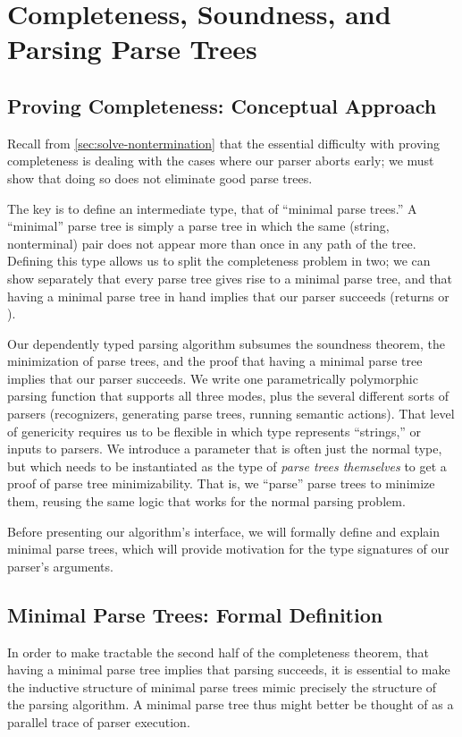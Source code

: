 \chapter{Completeness, Soundness, and Parsing Parse Trees}
\section{Proving Completeness: Conceptual Approach} \label{sec:conceptual-completeness} \label{sec:min:conceptual-intro}
  Recall from \autoref{sec:solve-nontermination} that the essential difficulty with proving completeness is dealing with the cases where our parser aborts early; we must show that doing so does not eliminate good parse trees.

  The key is to define an intermediate type, that of ``minimal parse trees.''  A ``minimal'' parse tree is simply a parse tree in which the same (string, nonterminal) pair does not appear more than once in any path of the tree.  Defining this type allows us to split the completeness problem in two; we can show separately that every parse tree gives rise to a minimal parse tree, and that having a minimal parse tree in hand implies that our parser succeeds (returns \true\space or \Some{\hole}).

  Our dependently typed parsing algorithm subsumes the soundness theorem, the minimization of parse trees, and the proof that having a minimal parse tree implies that our parser succeeds.  We write one parametrically polymorphic parsing function that supports all three modes, plus the several different sorts of parsers (recognizers, generating parse trees, running semantic actions).  That level of genericity requires us to be flexible in which type represents ``strings,'' or inputs to parsers.  We introduce a parameter that is often just the normal \String{} type, but which needs to be instantiated as the type of \emph{parse trees themselves} to get a proof of parse tree minimizability.  That is, we ``parse'' parse trees to minimize them, reusing the same logic that works for the normal parsing problem.

  Before presenting our algorithm's interface, we will formally define and explain minimal parse trees, which will provide motivation for the type signatures of our parser's arguments.

\section{Minimal Parse Trees: Formal Definition} \label{sec:min:formal-definition}
  In order to make tractable the second half of the completeness theorem, that having a minimal parse tree implies that parsing succeeds, it is essential to make the inductive structure of minimal parse trees mimic precisely the structure of the parsing algorithm.  A minimal parse tree thus might better be thought of as a parallel trace of parser execution.

